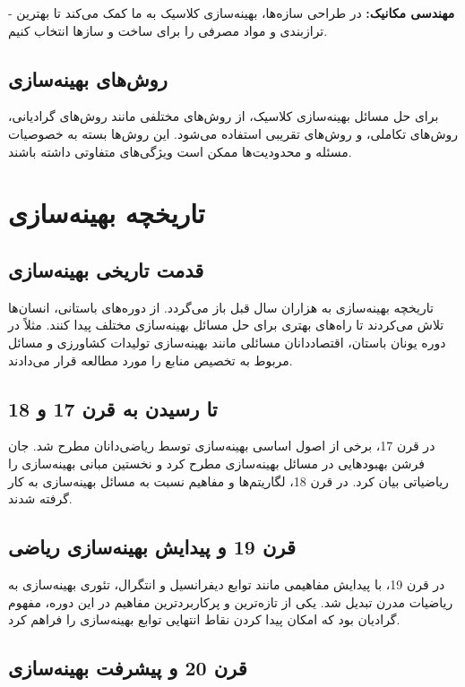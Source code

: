- \textbf{مهندسی مکانیک:} در طراحی سازه‌ها، بهینه‌سازی کلاسیک به ما کمک می‌کند تا بهترین ترازبندی و مواد مصرفی را برای ساخت و سازها انتخاب کنیم.

\subsection{روش‌های بهینه‌سازی}

برای حل مسائل بهینه‌سازی کلاسیک، از روش‌های مختلفی مانند روش‌های گرادیانی، روش‌های تکاملی، و روش‌های تقریبی استفاده می‌شود. این روش‌ها بسته به خصوصیات مسئله و محدودیت‌ها ممکن است ویژگی‌های متفاوتی داشته باشند.
\section{تاریخچه بهینه‌سازی}

\subsection{قدمت تاریخی بهینه‌سازی}

تاریخچه بهینه‌سازی به هزاران سال قبل باز می‌گردد. از دوره‌های باستانی، انسان‌ها تلاش می‌کردند تا راه‌های بهتری برای حل مسائل بهینه‌سازی مختلف پیدا کنند. مثلاً در دوره یونان باستان، اقتصاددانان مسائلی مانند بهینه‌سازی تولیدات کشاورزی و مسائل مربوط به تخصیص منابع را مورد مطالعه قرار می‌دادند.

\subsection{تا رسیدن به قرن 17 و 18}

در قرن 17، برخی از اصول اساسی بهینه‌سازی توسط ریاضی‌دانان مطرح شد. جان فرشن بهبودهایی در مسائل بهینه‌سازی مطرح کرد و نخستین مبانی بهینه‌سازی را ریاضیاتی بیان کرد. در قرن 18، لگاریتم‌ها و مفاهیم نسبت به مسائل بهینه‌سازی به کار گرفته شدند.

\subsection{قرن 19 و پیدایش بهینه‌سازی ریاضی}

در قرن 19، با پیدایش مفاهیمی مانند توابع دیفرانسیل و انتگرال، تئوری بهینه‌سازی به ریاضیات مدرن تبدیل شد. یکی از تازه‌ترین و پرکاربردترین مفاهیم در این دوره، مفهوم گرادیان بود که امکان پیدا کردن نقاط انتهایی توابع بهینه‌سازی را فراهم کرد.

\subsection{قرن 20 و پیشرفت بهینه‌سازی}


